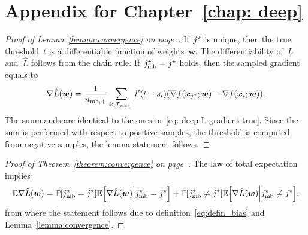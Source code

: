\chapter{Appendix for Chapter~\ref{chap: deep}}

\lemmacovergencedeep*
\begin{proof}[Proof of Lemma~\ref{lemma:convergence} on page~\pageref{lemma:convergence}]
  If~$j^{\star}$ is unique, then the true threshold~$t$ is a differentiable function of weights~$\bm{w}$. The differentiability of~$L$ and~$\hat{L}$ follows from the chain rule. If~$j^{\star}_{\text{mb}} = j^{\star}$ holds, then the sampled gradient equals to
  \begin{equation}\label{eq:grad_min_aux}
    \nabla \hat L(\bm{w})
      = \frac{1}{\nmbpos} \sum_{i\in \Imbpos} l'(t - s_i) \Brac{\nabla f(\bm{x}_{\indmax}; \bm{w}) - \nabla f(\bm{x}_i; \bm{w})}.
  \end{equation}
  The summands are identical to the ones in~\eqref{eq: deep L gradient true}. Since the sum is performed with respect to positive samples, the threshold is computed from negative samples, the lemma statement follows.
\end{proof}

\thmcovergencedeep*
\begin{proof}[Proof of Theorem~\ref{theorem:convergence} on page~\pageref{theorem:convergence}]
  The law of total expectation implies
  \begin{equation*}
    \EE \nabla \hat L(\bm{w})
      = \PP \Brac[s]{\indmaxmb = \indmax} \EE \Brac[s]{\nabla \hat L(\bm{w}) \middle\vert \indmaxmb =\indmax}
      + \PP \Brac[s]{\indmaxmb \neq \indmax} \EE \Brac[s]{\nabla \hat L(\bm{w}) \middle\vert\indmaxmb\neq \indmax},
  \end{equation*}
  from where the statement follows due to definition~\eqref{eq:defin_bias} and Lemma~\ref{lemma:convergence}.
\end{proof}
